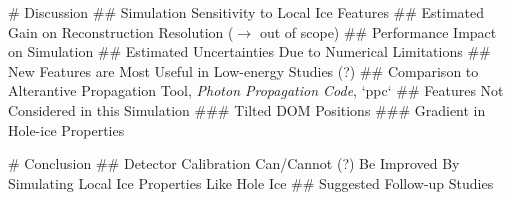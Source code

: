 # Discussion
## Simulation Sensitivity to Local Ice Features
## Estimated Gain on Reconstruction Resolution ($\rightarrow$ out of scope)
## Performance Impact on Simulation
## Estimated Uncertainties Due to Numerical Limitations
## New Features are Most Useful in Low-energy Studies (?)
## Comparison to Alterantive Propagation Tool, \textit{Photon Propagation Code}, `ppc`
## Features Not Considered in this Simulation
### Tilted DOM Positions
### Gradient in Hole-ice Properties

# Conclusion
## Detector Calibration Can/Cannot (?) Be Improved By Simulating Local Ice Properties Like Hole Ice
## Suggested Follow-up Studies
